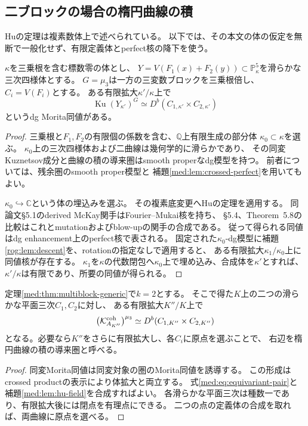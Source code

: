 \subsection{二ブロックの場合の楕円曲線の積}

Huの定理\cite[Theorems~0.1, 5.8]{TBHu}は複素数体上で述べられている。
以下では、その本文の体の仮定を無断で一般化せず、有限定義体とperfect核の降下を使う。

\begin{lemma}[Huの比較の有限拡大上への移行]
\label{med:lem:hu-field}
$\kappa$を三乗根を含む標数零の体とし、
$Y=V(F_1(x)+F_2(y))\subset\mathbb P^5_\kappa$を滑らかな三次四様体とする。
$G=\mu_3$は一方の三変数ブロックを三乗根倍し、$C_i=V(F_i)$とする。
ある有限拡大$\kappa'/\kappa$上で
\[
 \operatorname{Ku}(Y_{\kappa'})^G
 \simeq D^b(C_{1,\kappa'}\times C_{2,\kappa'})
\]
というdg Morita同値がある。
\end{lemma}
\begin{proof}
三乗根と$F_1,F_2$の有限個の係数を含む、$\mathbb Q$上有限生成の部分体
$\kappa_0\subset\kappa$を選ぶ。
$\kappa_0$上の三次四様体および二曲線は幾何学的に滑らかであり、
その同変Kuznetsov成分と曲線の積の導来圏はsmooth properなdg模型を持つ。
前者については、残余圏のsmooth proper模型と
補題\ref{med:lem:crossed-perfect}を用いてもよい。

$\kappa_0\hookrightarrow\mathbb C$という体の埋込みを選ぶ。
その複素底変更へHuの定理を適用する。
同論文\S5.1のderived McKay関手はFourier--Mukai核を持ち、
\S5.4、Theorem~5.8の比較はこれとmutationおよびblow-upの関手の合成である。
従って得られる同値はdg enhancement上のperfect核で表される。
固定された$\kappa_0$-dg模型に補題\ref{rog:lem:descent}を、rotationの指定なしで適用すると、
ある有限拡大$\kappa_1/\kappa_0$上に同値核が存在する。
$\kappa_1$を$\kappa$の代数閉包へ$\kappa_0$上で埋め込み、合成体を$\kappa'$とすれば、
$\kappa'/\kappa$は有限であり、所要の同値が得られる。
\end{proof}

\begin{corollary}[二ブロック残余圏の同変化の幾何模型]
\label{med:cor:elliptic-product}
定理\ref{med:thm:multiblock-generic}で$k=2$とする。
そこで得た$K$上の二つの滑らかな平面三次$C_1,C_2$に対し、
ある有限拡大$K''/K$上で
\begin{equation}\label{med:eq:elliptic-product}
 \bigl(\mathcal K^{\rm coh}_{A_{K''}}\bigr)^{\mu_3}
 \simeq D^b(C_{1,K''}\times C_{2,K''})
\end{equation}
となる。必要なら$K''$をさらに有限拡大し、各$C_i$に原点を選ぶことで、
右辺を楕円曲線の積の導来圏と呼べる。
\end{corollary}
\begin{proof}
同変Morita同値は同変対象の圏のMorita同値を誘導する。
この形成はcrossed productの表示により体拡大と両立する。
式\eqref{med:eq:equivariant-pair}と補題\ref{med:lem:hu-field}を合成すればよい。
各滑らかな平面三次は種数一であり、有限拡大後には閉点を有理点にできる。
二つの点の定義体の合成を取れば、両曲線に原点を選べる。
\end{proof}

